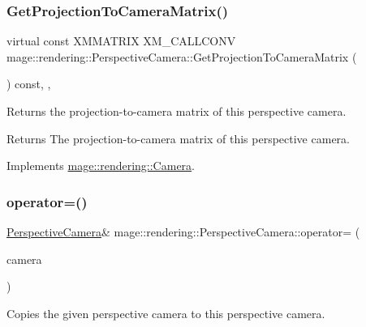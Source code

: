 \subsubsection{\texorpdfstring{Get\+Projection\+To\+Camera\+Matrix()}{GetProjectionToCameraMatrix()}}
{\footnotesize\ttfamily virtual const X\+M\+M\+A\+T\+R\+IX X\+M\+\_\+\+C\+A\+L\+L\+C\+O\+NV mage\+::rendering\+::\+Perspective\+Camera\+::\+Get\+Projection\+To\+Camera\+Matrix (\begin{DoxyParamCaption}{ }\end{DoxyParamCaption}) const\hspace{0.3cm}{\ttfamily [override]}, {\ttfamily [virtual]}, {\ttfamily [noexcept]}}

Returns the projection-\/to-\/camera matrix of this perspective camera.

\begin{DoxyReturn}{Returns}
The projection-\/to-\/camera matrix of this perspective camera. 
\end{DoxyReturn}


Implements \hyperlink{classmage_1_1rendering_1_1_camera_abb21116f8a6c7513804431d23fa4cf17}{mage\+::rendering\+::\+Camera}.

\hypertarget{classmage_1_1rendering_1_1_perspective_camera_ac9119d544f7ca6c4fbe1a6c5118bcd66}{}\label{classmage_1_1rendering_1_1_perspective_camera_ac9119d544f7ca6c4fbe1a6c5118bcd66} 
\subsubsection{\texorpdfstring{operator=()}{operator=()}\hspace{0.1cm}{\footnotesize\ttfamily [1/2]}}
{\footnotesize\ttfamily \hyperlink{classmage_1_1rendering_1_1_perspective_camera}{Perspective\+Camera}\& mage\+::rendering\+::\+Perspective\+Camera\+::operator= (\begin{DoxyParamCaption}\item[{const \hyperlink{classmage_1_1rendering_1_1_perspective_camera}{Perspective\+Camera} \&}]{camera }\end{DoxyParamCaption})\hspace{0.3cm}{\ttfamily [delete]}}

Copies the given perspective camera to this perspective camera.


